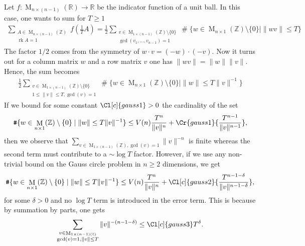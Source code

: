 \documentclass{amsart}
\theoremstyle{definition}
\theoremstyle{remark}
\DeclareMathOperator{\M}{M}
\DeclareMathOperator{\card}{\texttt{\#}}
\DeclareMathOperator{\rank}{rk}
\begin{document}
Let $f:\M_{n \times (n-1)}(\mathbb{R}) \rightarrow  \mathbb{R}$ be the indicator function of a unit ball.
In this case, one wants to sum for $T \geq 1$
\begin{align}
    \sum_{\substack{A \in \M_{n \times (n-1)}(\mathbb{Z}) \\ \rank A = 1}} f( \tfrac{1}{T}A)
    =
    \frac{1}{2}\sum_{\substack{v \in \M_{1 \times (n-1)}(\mathbb{Z}) \setminus \{0\} \\ \gcd(v_{1},\dots,v_{n-1}) = 1} } 
    \card \{ w \in \M_{n \times 1}(\mathbb{Z}) \setminus \{0\} \mid \|w v\| \leq T \} 
\end{align}
The factor $1/2$ comes from the symmetry of $w \cdot v = (-w) \cdot (-v)$.
Now it turns out for a column matrix $w$ and a row matrix $v$ one has $\|wv\|=\|w\|\|v\|$. Hence, the sum becomes
\begin{align}
    \frac{1}{2}\sum_{\substack{v \in \M_{1 \times (n-1)}(\mathbb{Z}) \setminus \{0\} \\ 1 \leq \|v\| \leq T , \gcd(v)=1} } 
    \card \{ w \in \M_{n \times 1}(\mathbb{Z}) \setminus \{0\} \mid \|w\| \leq T \|v\|^{-1} \} 
\end{align}
If we bound for some constant $\Cl[c]{gauss1}>0$ the cardinality of the set 
\begin{equation}
    \card \{ w \in \M_{n \times 1}(\mathbb{Z}) \setminus \{0\} \mid \|w\| \leq T \|v\|^{-1} \} \leq V(n)\frac{T^{n}}{\|v\|^{n}} + \Cr{gauss1}{ \frac{T^{n-1}}{\|v\|^{n-1}}},
\end{equation}
then we observe that $\sum_{v \in \M_{1 \times (n-1)}(\mathbb{Z}), \gcd(v)=1} \|v\|^{-n}$ is finite whereas 
the second term must contribute to a $\sim \log T$ factor. However, if we use any non-trivial bound on the Gauss circle problem in $n \geq 2$ dimensions, we get
\begin{equation}
    \card \{ w \in \M_{n \times 1}(\mathbb{Z}) \setminus \{0\} \mid \|w\| \leq T \|v\|^{-1} \} \leq V(n)\frac{T^{n}}{\|v\|^{n}} + \Cl[c]{gauss2}{ \frac{T^{n-1- \delta} }{\|v\|^{n-1 - \delta}}} ,
\end{equation}
for some $\delta>0$ and no $\log T$ term is introduced in the error term. This is because by summation by parts, one gets
\begin{equation}
    \sum_{\substack{v \in \M_{1 \times (n-1) (\mathbb{Z})} \\ \gcd(v)=1, \|v\|\leq T} } \|v\|^{-(n-1-\delta)}  \leq \Cl[c]{gauss3} T^{\delta}.
\end{equation}
\end{document}
